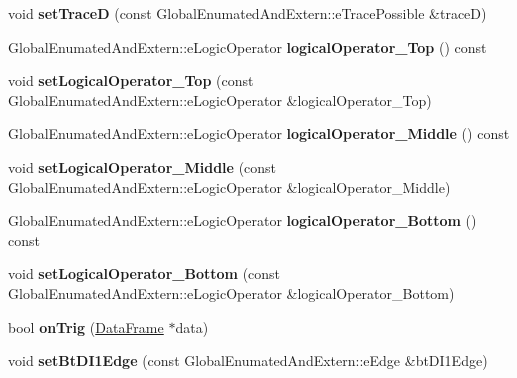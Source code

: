 \begin{DoxyCompactItemize}
void {\bfseries set\+TraceD} (const Global\+Enumated\+And\+Extern\+::e\+Trace\+Possible \&traceD)
\item 
\mbox{\label{class_trigger_functions_abb15ad36e12c370225116f1e92f4f151}} 
Global\+Enumated\+And\+Extern\+::e\+Logic\+Operator {\bfseries logical\+Operator\+\_\+\+Top} () const
\item 
\mbox{\label{class_trigger_functions_a3295d924de31d20ab3b11b6794f3dd05}} 
void {\bfseries set\+Logical\+Operator\+\_\+\+Top} (const Global\+Enumated\+And\+Extern\+::e\+Logic\+Operator \&logical\+Operator\+\_\+\+Top)
\item 
\mbox{\label{class_trigger_functions_a6afe86d769c34c0c846b45107bc50519}} 
Global\+Enumated\+And\+Extern\+::e\+Logic\+Operator {\bfseries logical\+Operator\+\_\+\+Middle} () const
\item 
\mbox{\label{class_trigger_functions_a3270652e7a94291b3498c2b55b6a1a09}} 
void {\bfseries set\+Logical\+Operator\+\_\+\+Middle} (const Global\+Enumated\+And\+Extern\+::e\+Logic\+Operator \&logical\+Operator\+\_\+\+Middle)
\item 
\mbox{\label{class_trigger_functions_ab599fd5c57bf915f2dc846d2192a2f50}} 
Global\+Enumated\+And\+Extern\+::e\+Logic\+Operator {\bfseries logical\+Operator\+\_\+\+Bottom} () const
\item 
\mbox{\label{class_trigger_functions_a7ebf3f402f049c09dea569697e7f3c88}} 
void {\bfseries set\+Logical\+Operator\+\_\+\+Bottom} (const Global\+Enumated\+And\+Extern\+::e\+Logic\+Operator \&logical\+Operator\+\_\+\+Bottom)
\item 
\mbox{\label{class_trigger_functions_a8560b190b59763cb33d324d5740a2b97}} 
bool {\bfseries on\+Trig} (\hyperlink{class_data_frame}{Data\+Frame} $\ast$data)
\item 
\mbox{\label{class_trigger_functions_a2abdb04c3ac00c855e87ea73273d5651}} 
void {\bfseries set\+Bt\+D\+I1\+Edge} (const Global\+Enumated\+And\+Extern\+::e\+Edge \&bt\+D\+I1\+Edge)
\item 

\end{DoxyCompactItemize}
